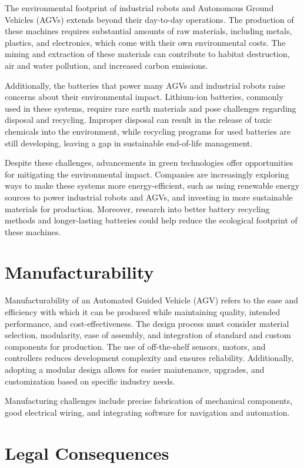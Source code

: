 \documentclass[../../main]{subfiles}
\begin{document}
The environmental footprint of industrial robots and Autonomous Ground Vehicles (AGVs) extends 
beyond their day-to-day operations. The production of these machines requires substantial amounts 
of raw materials, including metals, plastics, and electronics, which come with their own environmental costs. 
The mining and extraction of these materials can contribute to habitat destruction, air and water pollution, 
and increased carbon emissions.

Additionally, the batteries that power many AGVs and industrial robots raise concerns about their 
environmental impact. Lithium-ion batteries, commonly used in these systems, require rare earth materials 
and pose challenges regarding disposal and recycling. Improper disposal can result in the release of toxic 
chemicals into the environment, while recycling programs for used batteries are still developing, leaving a 
gap in sustainable end-of-life management.

Despite these challenges, advancements in green technologies offer opportunities for mitigating the 
environmental impact. Companies are increasingly exploring ways to make these systems more energy-efficient, 
such as using renewable energy sources to power industrial robots and AGVs, and investing in more sustainable 
materials for production. Moreover, research into better battery recycling methods and longer-lasting batteries 
could help reduce the ecological footprint of these machines.

\section{Manufacturability}

Manufacturability of an Automated Guided Vehicle (AGV) refers to the ease and efficiency with 
which it can be produced while maintaining quality, intended performance, and cost-effectiveness. 
The design process must consider material selection, modularity, ease of assembly, and integration 
of standard and custom components for production. The use of off-the-shelf sensors, motors, and 
controllers reduces development complexity and ensures reliability. Additionally, adopting a modular 
design allows for easier maintenance, upgrades, and customization based on specific industry needs.

Manufacturing challenges include precise fabrication of mechanical components, good electrical 
wiring, and integrating software for navigation and automation.

\section{Legal Consequences}
\end{document}
